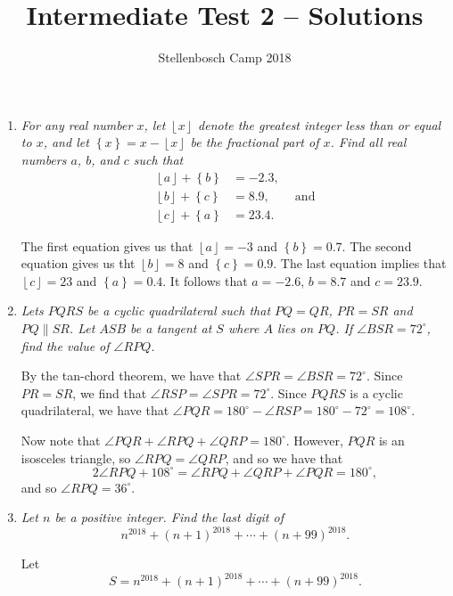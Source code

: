 \documentclass{article}
\title{Intermediate Test 2 -- Solutions}
\author{Stellenbosch Camp 2018}
\date{\vspace{-12pt}}
\newcommand{\floor}[1]{\ensuremath{\left\lfloor#1\right\rfloor}}
\newcommand{\fracpart}[1]{\ensuremath{\left\{#1\right\}}}
\begin{document}
\maketitle

\begin{enumerate}

\item %
\textit{For any real number $x$, let $\floor{x}$ denote the greatest integer less than or equal to $x$, and let $\fracpart{x} = x -\floor{x}$ be the fractional part of $x$. Find all real numbers $a$, $b$, and $c$ such that
\begin{align*}
  \floor{a} +\fracpart{b} &= -2.3, \\
  \floor{b} +\fracpart{c} &= 8.9, \qquad \mathrm{and}\\
  \floor{c} +\fracpart{a} &= 23.4.
\end{align*}}

The first equation gives us that $\floor{a} = -3$ and $\fracpart{b} = 0.7$. The second equation gives us tht $\floor{b} = 8$ and $\fracpart{c} = 0.9$. The last equation implies that $\floor{c} = 23$ and $\fracpart{a} = 0.4$. It follows that $a = -2.6$, $b = 8.7$ and $c = 23.9$.


\vspace{12pt}
\item %
\textit{Lets $PQRS$ be a cyclic quadrilateral such that $PQ = QR$, $PR = SR$ and $PQ \parallel SR$. Let $ASB$ be a tangent at $S$ where $A$ lies on $PQ$. If $\angle BSR = 72^{\circ}$, find the value of $\angle RPQ$.}

By the tan-chord theorem, we have that $\angle SPR = \angle BSR = 72^\circ$. Since $PR = SR$, we find that $\angle RSP = \angle SPR = 72^\circ$. Since $PQRS$ is a cyclic quadrilateral, we have that $\angle PQR = 180^\circ - \angle RSP = 180^\circ - 72^\circ = 108^\circ$.

Now note that $\angle PQR + \angle RPQ + \angle QRP = 180^\circ$. However, $PQR$ is an isosceles triangle, so $\angle RPQ = \angle QRP$, and so we have that
\[
	2\angle RPQ + 108^\circ = \angle RPQ + \angle QRP + \angle PQR = 180^\circ,
\]
and so $\angle RPQ = 36^\circ$.


\vspace{12pt}
\item %
\textit{Let $n$ be a positive integer. Find the last digit of \[ n^{2018} +(n+1)^{2018} +\dotsb +(n+99)^{2018}. \]}

Let
\[
	S = n^{2018} + {(n + 1)}^{2018} + \cdots + {(n + 99)}^{2018}.
\]


\end{enumerate}
\end{document}
